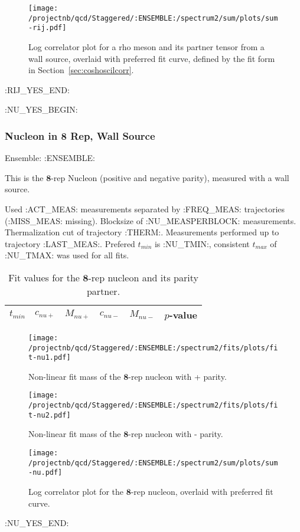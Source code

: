 \begin{figure}[H]
\centering
\texttt{[image: /projectnb/qcd/Staggered/:ENSEMBLE:/spectrum2/sum/plots/sum-rij.pdf]}
\caption{Log correlator plot for a rho meson and its partner tensor from a wall source, overlaid with preferred fit curve, defined by the fit form in Section~\ref{sec:coshoscilcorr}.}
\end{figure}


\clearpage
:RIJ_YES_END:

:NU_YES_BEGIN:
\subsubsection{Nucleon in $\mathbf{8}$ Rep, Wall Source}

Ensemble: :ENSEMBLE:

This is the $\mathbf{8}$-rep Nucleon (positive and negative parity), measured with a wall source.

{\small{Used :ACT_MEAS: measurements separated by :FREQ_MEAS: trajectories (:MISS_MEAS: missing). Blocksize of :NU_MEASPERBLOCK: measurements. Thermalization cut of trajectory :THERM:. Measurements performed up to trajectory :LAST_MEAS:. Prefered $t_{min}$ is :NU_TMIN:, consistent $t_{max}$ of :NU_TMAX: was used for all fits.}}


\begin{table}[ht!]
\centering
\scriptsize
\begin{tabular}{|c|c|c|c|c|c|}
\hline
 $t_{min}$ & $c_{nu+}$ &  $M_{nu+}$ & $c_{nu-}$ & $M_{nu-}$ & $p$-value \\
\hline

\end{tabular}
\caption{Fit values for the $\mathbf{8}$-rep nucleon and its parity partner.}
\end{table}

\begin{multicols}{2}
\begin{figure}[H]
\centering
\texttt{[image: /projectnb/qcd/Staggered/:ENSEMBLE:/spectrum2/fits/plots/fit-nu1.pdf]}
\caption{Non-linear fit mass of the $\mathbf{8}$-rep nucleon with + parity.}
\end{figure}
\columnbreak
\begin{figure}[H]
\centering
\texttt{[image: /projectnb/qcd/Staggered/:ENSEMBLE:/spectrum2/fits/plots/fit-nu2.pdf]}
\caption{Non-linear fit mass of the $\mathbf{8}$-rep nucleon with - parity.}
\end{figure}
\end{multicols}

\begin{figure}[H]
\centering
\texttt{[image: /projectnb/qcd/Staggered/:ENSEMBLE:/spectrum2/sum/plots/sum-nu.pdf]}
\caption{Log correlator plot for the $\mathbf{8}$-rep nucleon, overlaid with preferred fit curve.}
\end{figure}

\clearpage
:NU_YES_END:
